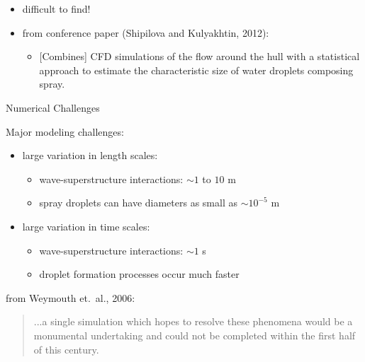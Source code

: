 
\begin{frame}{\thesec}{\thesubsec}
  \vspace*{-2\baselineskip}
  \begin{itemize}
    \item{
      difficult to find!
    }
    \vspace*{3\baselineskip}
    \item{
      from conference paper \cite{Shipilova12} (Shipilova and Kulyakhtin, 2012):
      \begin{itemize}
        \item{
          [Combines] CFD simulations of the flow around the hull with a statistical approach to estimate the characteristic size of water droplets composing spray.
        }
      \end{itemize}
    } 
  \end{itemize}
\end{frame}

\begin{frame}{\thesec}{Numerical Challenges}
  \vspace*{-2\baselineskip}
  \begin{block}{Major modeling challenges:}
    \begin{itemize}
      \item{ large variation in length scales:
	      \begin{itemize}
	        \item{
			  wave-superstructure interactions: $\sim \text{1}$ to $\text{10}$ m
		    }
		    \item{
			  spray droplets can have diameters as small as $\sim \text{10}^{-\text{5}}$ m
			}
		  \end{itemize}
	  }
	  \item{ large variation in time scales:
	    \begin{itemize}
	      \item{ wave-superstructure interactions: $\sim \text{1}$ s }
		  \item{ droplet formation processes occur much faster }
		\end{itemize}
	  }
	\end{itemize}
  \end{block}
  \vspace*{-\baselineskip}
  \begin{block}{from Weymouth et.~al., 2006:}
	\begin{quote}
	  ...a single simulation which hopes to resolve these phenomena would be a monumental undertaking and could not be completed within the first half of this century.
	\end{quote}
  \end{block}
\end{frame}